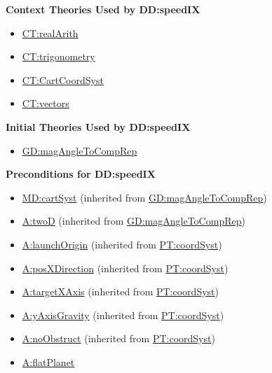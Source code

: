 \documentclass[12pt]{article}
\begin{document}
\noindent \textbf{Context Theories Used by DD:speedIX}

\begin{itemize}
\item \hyperref[CT:realArith]{CT:realArith}
\item \hyperref[CT:trigonometry]{CT:trigonometry}
\item \hyperref[CT:CartCoordSyst]{CT:CartCoordSyst}
\item \hyperref[CT:vectors]{CT:vectors}
\end{itemize}

\noindent \textbf{Initial Theories Used by DD:speedIX}

\begin{itemize}
\item \hyperref[GD:magAngleToCompRep]{GD:magAngleToCompRep}
\end{itemize}

\noindent \textbf{Preconditions for DD:speedIX}

\begin{itemize}
\item \hyperref[MD:cartSyst]{MD:cartSyst} (inherited from \hyperref[GD:magAngleToCompRep]{GD:magAngleToCompRep})
\item \hyperref[twoD]{A:twoD} (inherited from \hyperref[GD:magAngleToCompRep]{GD:magAngleToCompRep})
\item \hyperref[launchOrigin]{A:launchOrigin} (inherited from \hyperref[PT:coordSyst]{PT:coordSyst})
\item \hyperref[posXDirection]{A:posXDirection} (inherited from \hyperref[PT:coordSyst]{PT:coordSyst})
\item \hyperref[targetXAxis]{A:targetXAxis} (inherited from \hyperref[PT:coordSyst]{PT:coordSyst})
\item \hyperref[yAxisGravity]{A:yAxisGravity} (inherited from \hyperref[PT:coordSyst]{PT:coordSyst})
\item \hyperref[noObstruct]{A:noObstruct} (inherited from \hyperref[PT:coordSyst]{PT:coordSyst})
\item \hyperref[flatPlanet]{A:flatPlanet}
\end{itemize}
\end{document}
